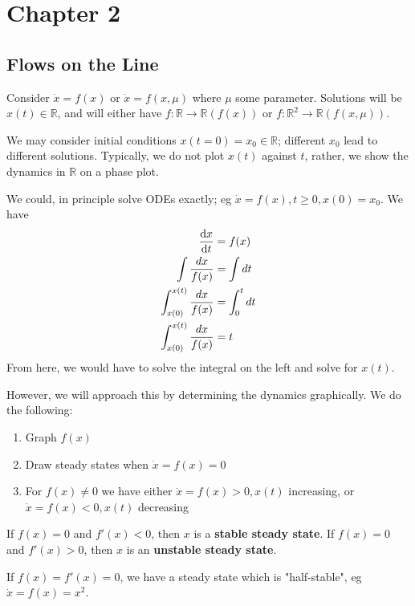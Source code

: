\documentclass[12pt]{article}
\begin{document}
\newpage

\section{Chapter 2}

\subsection{Flows on the Line}

Consider $\dot{x} = f(x)$ or $\dot{x} = f(x, \mu)$ where $\mu$ some parameter. Solutions will be $x(t) \in \mathbb{R}$, and will either have $f: \mathbb{R} \to \mathbb{R} (f(x))$ or $f: \mathbb{R}^2 \to \mathbb{R} (f(x,\mu))$.

We may consider initial conditions $x(t=0) = x_0 \in \mathbb{R}$; different $x_0$ lead to different solutions. Typically, we do not plot $x(t)$ against $t$, rather, we show the dynamics in $\mathbb{R}$ on a phase plot.

We could, in principle solve ODEs exactly; eg $\dot{x} =f(x), t \geq 0, x(0) = x_0$. We have \begin{align*}
  \dv{x}{t} &= f(x)\\
  \int \frac{dx}{f(x)} &= \int dt\\
  \int_{x(0)}^{x(t)} \frac{dx}{f(x)} &= \int_0^t dt\\
  \int_{x(0)}^{x(t)} \frac{dx}{f(x)} &= t
\end{align*}
From here, we would have to solve the integral on the left and solve for $x(t)$.

However, we will approach this by determining the dynamics graphically. We do the following:

\begin{enumerate}
  \item Graph $f(x)$
  \item Draw steady states when $\dot{x} = f(x) = 0$
  \item For $f(x) \neq 0$ we have either $\dot{x} = f(x) > 0, x(t)$ increasing, or $\dot{x} = f(x) < 0, x(t)$ decreasing
\end{enumerate}

\begin{remark}
  If $f(x) = 0$ and $f'(x) < 0$, then $x$ is a \textbf{stable steady state}. If $f(x) = 0$ and $f'(x) > 0$, then $x$ is an \textbf{unstable steady state}.

  If $f(x) = f'(x) = 0$, we have a steady state which is "half-stable", eg $\dot{x} = f(x) = x^2$.
\end{remark}
\end{document}
